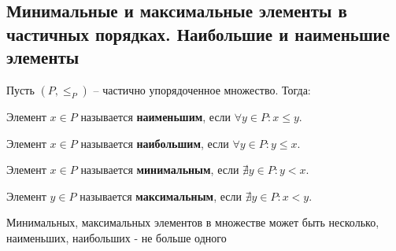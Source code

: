 \subsection{Минимальные и максимальные элементы в частичных порядках. Наибольшие и наименьшие элементы}

Пусть $(P, \le_P)$ -- частично упорядоченное множество. Тогда:

Элемент $x \in P$ называется \textbf{наименьшим}, если $\forall y \in P : x \le y$.

Элемент $x \in P$ называется \textbf{наибольшим}, если $\forall y \in P : y \le x$.

Элемент $x \in P$ называется \textbf{минимальным}, если $\nexists y \in P: y < x$.

Элемент $y \in P$ называется \textbf{максимальным}, если $\nexists y \in P: x < y$.

Минимальных, максимальных элементов в множестве может быть несколько, наименьших, наибольших - не больше одного
